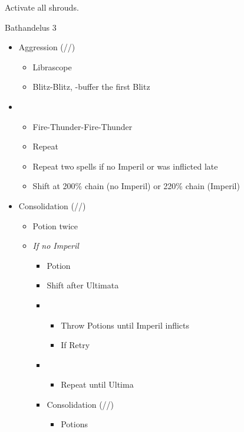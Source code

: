 \renewcommand{\second}{[2] Aggression (\com/\com/\rav)}
\renewcommand{\third}{[3] Consolidation (\sen/\sen/\med)}
\renewcommand{\fourth}{[4] Malevolence (\syn/\rav/\rav)}

Activate all shrouds.

\begin{battle}{Bathandelus 3}
\begin{multicols}{2}
\begin{itemize}
    \item \second
    \begin{itemize}
        \item Librascope
        \item Blitz-Blitz, \rav-buffer the first Blitz
    \end{itemize}
    \item \fifth
    \begin{itemize}
        \item Fire-Thunder-Fire-Thunder
        \item Repeat
        \item Repeat two spells if no Imperil or was inflicted late
        \item Shift at 200\% chain (no Imperil) or 220\% chain (Imperil)
    \end{itemize}
    \item \third
    \begin{itemize}
        \item Potion twice
        \item \textit{If no Imperil}
        \begin{itemize}
            \item Potion
            \item Shift after Ultimata
            \item \fifth
            \begin{itemize}
                \item Throw Potions until Imperil inflicts
                \item If \stagger Retry
            \end{itemize}
            \item \first
            \begin{itemize}
                \item Repeat until Ultima
            \end{itemize}
            \item \third
            \begin{itemize}
                \item Potions

\end{itemize}
\end{itemize}
\end{itemize}
\end{itemize}
\end{multicols}
\end{battle}
